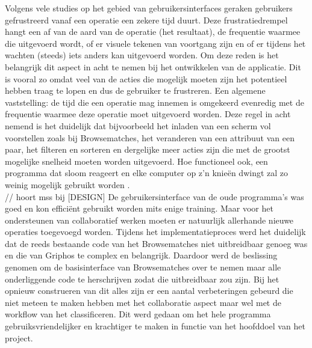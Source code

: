 Volgens vele studies op het gebied van gebruikersinterfaces \cite{Hoxmeier00,Shneiderman84,Nielsen94} geraken gebruikers gefrustreerd vanaf een operatie een zekere tijd duurt. Deze frustratiedrempel hangt een af van de aard van de operatie (het resultaat), de frequentie waarmee die uitgevoerd wordt, of er visuele tekenen van voortgang zijn en of er tijdens het wachten (steeds) iets anders kan uitgevoerd worden. Om deze reden is het belangrijk dit aspect in acht te nemen bij het ontwikkelen van de applicatie. Dit is vooral zo omdat veel van de acties die mogelijk moeten zijn het potentieel hebben traag te lopen en dus de gebruiker te frustreren. Een algemene vaststelling: de tijd die een operatie mag innemen is omgekeerd evenredig met de frequentie waarmee deze operatie moet uitgevoerd worden. Deze regel in acht nemend is het duidelijk dat bijvoorbeeld het inladen van een scherm vol voorstellen zoals bij Browsematches, het veranderen van een attribuut van een paar, het filteren en sorteren en dergelijke meer acties zijn die met de grootst mogelijke snelheid moeten worden uitgevoerd. Hoe functioneel ook, een programma dat sloom reageert en elke computer op z'n knie\"en dwingt zal zo weinig mogelijk gebruikt worden \cite{Joel2001}.\\

// hoort mss bij [DESIGN]
De gebruikersinterface van de oude programma's was goed en kon effici\"ent gebruikt worden mits enige training. Maar voor het ondersteunen van collaboratief werken moeten er natuurlijk allerhande nieuwe operaties toegevoegd
worden. Tijdens het implementatieproces werd het duidelijk dat de reeds bestaande code van het Browsematches niet uitbreidbaar genoeg was en die van Griphos te complex en belangrijk. Daardoor werd de beslissing genomen om de
basisinterface van Browsematches over te nemen maar alle onderliggende code te herschrijven zodat die uitbreidbaar zou zijn. Bij het opnieuw construeren van dit alles zijn er een aantal verbeteringen gebeurd die niet meteen te maken hebben met het collaboratie aspect maar wel met de workflow van het classificeren. Dit werd gedaan om het hele programma gebruiksvriendelijker en krachtiger te maken in functie van het hoofddoel van het project.

